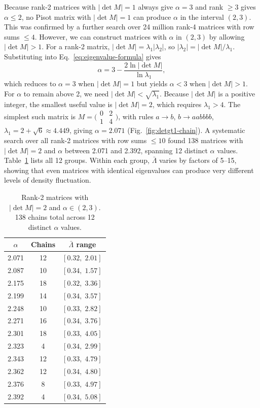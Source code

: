 \documentclass[11pt]{article}
\begin{document}
Because rank-2 matrices with $|\det M| = 1$ always give $\alpha = 3$ and rank $\geq 3$ gives $\alpha \leq 2$, no Pisot matrix with $|\det M| = 1$ can produce $\alpha$ in the interval $(2, 3)$. This was confirmed by a further search over 24 million rank-4 matrices with row sums $\leq 4$. However, we can construct matrices with $\alpha$ in $(2,3)$ by allowing $|\det M| > 1$. For a rank-2 matrix, $|\det M| = \lambda_1|\lambda_2|$, so $|\lambda_2| = |\det M|/\lambda_1$. Substituting into Eq.~\eqref{eq:eigenvalue-formula} gives
\begin{equation}
 \alpha = 3 - \frac{2\ln|\det M|}{\ln\lambda_1},
 \label{eq:alpha-detgt1}
\end{equation}
which reduces to $\alpha = 3$ when $|\det M| = 1$ but yields $\alpha < 3$ when $|\det M| > 1$. For $\alpha$ to remain above 2, we need $|\det M| < \sqrt{\lambda_1}$. Because $|\det M|$ is a positive integer, the smallest useful value is $|\det M| = 2$, which requires $\lambda_1 > 4$. The simplest such matrix is $M = \bigl(\begin{smallmatrix} 0 & 2 \\ 1 & 4 \end{smallmatrix}\bigr)$, with rules $a \to b$, $b \to aabbbb$, $\lambda_1 = 2 + \sqrt{6} \approx 4.449$, giving $\alpha = 2.071$ (Fig.~\ref{fig:detgt1-chain}). A systematic search over all rank-2 matrices with row sums $\leq 10$ found 138 matrices with $|\det M| = 2$ and $\alpha$ between 2.071 and 2.392, spanning 12 distinct $\alpha$ values. Table~\ref{tab:detgt1} lists all 12 groups. Within each group, $\bar\Lambda$ varies by factors of 5--15, showing that even matrices with identical eigenvalues can produce very different levels of density fluctuation.

\begin{table}[H]
\centering
\begin{tabular}{ccc}
\toprule
$\alpha$ & Chains & $\bar\Lambda$ range \\
\midrule
2.071 & 12 & $[0.32,\; 2.01]$ \\
2.087 & 10 & $[0.34,\; 1.57]$ \\
2.175 & 18 & $[0.32,\; 3.36]$ \\
2.199 & 14 & $[0.34,\; 3.57]$ \\
2.248 & 10 & $[0.33,\; 2.82]$ \\
2.271 & 16 & $[0.34,\; 3.76]$ \\
2.301 & 18 & $[0.33,\; 4.05]$ \\
2.323 &  4 & $[0.34,\; 2.99]$ \\
2.343 & 12 & $[0.33,\; 4.79]$ \\
2.362 & 12 & $[0.34,\; 4.80]$ \\
2.376 &  8 & $[0.33,\; 4.97]$ \\
2.392 &  4 & $[0.34,\; 5.08]$ \\
\bottomrule
\end{tabular}
\caption{Rank-2 matrices with $|\det M| = 2$ and $\alpha \in (2,3)$. 138 chains total across 12 distinct $\alpha$ values.}
\label{tab:detgt1}
\end{table}
\end{document}
